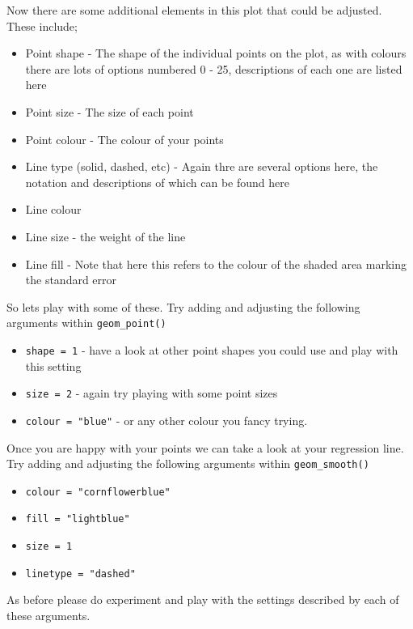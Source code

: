 \documentclass[
]{book}
\providecommand{\tightlist}{%
  \setlength{\itemsep}{0pt}\setlength{\parskip}{0pt}}
\begin{document}
Now there are some additional elements in this plot that could be adjusted. These include;

\begin{itemize}
\tightlist
\item
  Point shape - The shape of the individual points on the plot, as with colours there are lots of options numbered 0 - 25, descriptions of each one are listed here
\item
  Point size - The size of each point
\item
  Point colour - The colour of your points
\item
  Line type (solid, dashed, etc) - Again thre are several options here, the notation and descriptions of which can be found here
\item
  Line colour
\item
  Line size - the weight of the line
\item
  Line fill - Note that here this refers to the colour of the shaded area marking the standard error
\end{itemize}

So lets play with some of these. Try adding and adjusting the following arguments within \texttt{geom\_point()}

\begin{itemize}
\tightlist
\item
  \texttt{shape\ =\ 1} - have a look at other point shapes you could use and play with this setting
\item
  \texttt{size\ =\ 2} - again try playing with some point sizes
\item
  \texttt{colour\ =\ "blue"} - or any other colour you fancy trying.
\end{itemize}

Once you are happy with your points we can take a look at your regression line. Try adding and adjusting the following arguments within \texttt{geom\_smooth()}

\begin{itemize}
\tightlist
\item
  \texttt{colour\ =\ "cornflowerblue"}
\item
  \texttt{fill\ =\ "lightblue"}
\item
  \texttt{size\ =\ 1}
\item
  \texttt{linetype\ =\ "dashed"}
\end{itemize}

As before please do experiment and play with the settings described by each of these arguments.
\end{document}
